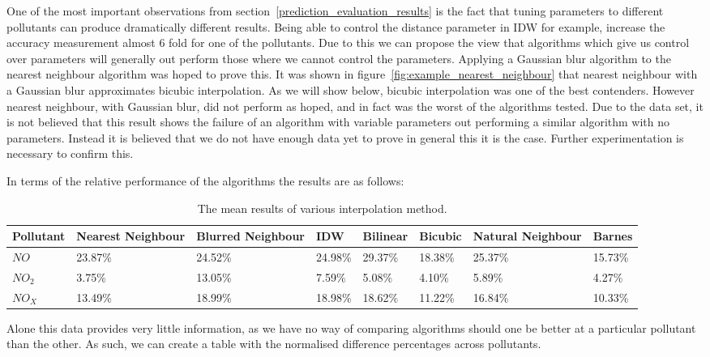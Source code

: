 		One of the most important observations from section~\ref{prediction_evaluation_results} is the fact that tuning parameters to different pollutants can produce dramatically different results. Being able to control the distance parameter in IDW for example, increase the accuracy measurement almost 6 fold for one of the pollutants. Due to this we can propose the view that algorithms which give us control over parameters will generally out perform those where we cannot control the parameters. Applying a Gaussian blur algorithm to the nearest neighbour algorithm was hoped to prove this. It was shown in figure~\ref{fig:example_nearest_neighbour} that nearest neighbour with a Gaussian blur approximates bicubic interpolation. As we will show below, bicubic interpolation was one of the best contenders. However nearest neighbour, with Gaussian blur, did not perform as hoped, and in fact was the worst of the algorithms tested. Due to the data set, it is not believed that this result shows the failure of an algorithm with variable parameters out performing a similar algorithm with no parameters. Instead it is believed that we do not have enough data yet to prove in general this it is the case. Further experimentation is necessary to confirm this. 

		In terms of the relative performance of the algorithms the results are as follows:

		\begin{table}[H]
			\centering
    		\begin{tabularx}{\linewidth}{|X|X|X|X|X|X|X|X|}
    			\hline
				Pollutant & Nearest Neighbour & Blurred Neighbour & IDW & Bilinear & Bicubic & Natural Neighbour & Barnes \\ \hline
				$NO$ & 23.87\% & 24.52\% & 24.98\% & 29.37\% & 18.38\% & 25.37\% & 15.73\% \\
				$NO_{2}$ & 3.75\% & 13.05\% & 7.59\% & 5.08\% & 4.10\% & 5.89\% & 4.27\% \\
				$NO_{X}$ & 13.49\% & 18.99\% & 18.98\% & 18.62\% & 11.22\% & 16.84\% & 10.33\% \\
				\hline
			\end{tabularx}
			\caption{The mean results of various interpolation method.}
			\label{tab:all_results}
		\end{table}

		Alone this data provides very little information, as we have no way of comparing algorithms should one be better at a particular pollutant than the other. As such, we can create a table with the normalised difference percentages across pollutants. 

